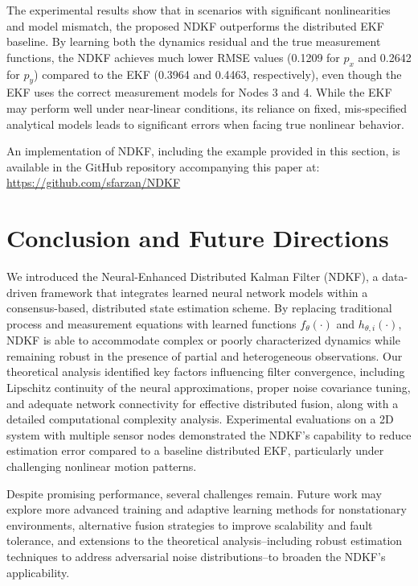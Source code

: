\documentclass[letterpaper, 10 pt, conference]{ieeeconf}
\begin{document}
The experimental results show that in scenarios with significant nonlinearities and model mismatch, the proposed NDKF outperforms the distributed EKF baseline. By learning both the dynamics residual and the true measurement functions, the NDKF achieves much lower RMSE values (0.1209 for $p_x$ and 0.2642 for $p_y$) compared to the EKF (0.3964 and 0.4463, respectively), even though the EKF uses the correct measurement models for Nodes 3 and 4. While the EKF may perform well under near‑linear conditions, its reliance on fixed, mis‑specified analytical models leads to significant errors when facing true nonlinear behavior.
 
An implementation of NDKF, including the example provided in this section, is available in the GitHub repository accompanying this paper at: \\{\small\url{https://github.com/sfarzan/NDKF}}

\section{Conclusion and Future Directions}\label{sec:conclusion}

We introduced the Neural-Enhanced Distributed Kalman Filter (NDKF), a data-driven framework that integrates learned neural network models within a consensus-based, distributed state estimation scheme. By replacing traditional process and measurement equations with learned functions $f_{\theta}(\cdot)$ and $h_{\theta,i}(\cdot)$, NDKF is able to accommodate complex or poorly characterized dynamics while remaining robust in the presence of partial and heterogeneous observations.
Our theoretical analysis identified key factors influencing filter convergence, including Lipschitz continuity of the neural approximations, proper noise covariance tuning, and adequate network connectivity for effective distributed fusion, along with a detailed computational complexity analysis. Experimental evaluations on a 2D system with multiple sensor nodes demonstrated the NDKF’s capability to reduce estimation error compared to a baseline distributed EKF, particularly under challenging nonlinear motion patterns.

Despite promising performance, several challenges remain. Future work may explore more advanced training and adaptive learning methods for nonstationary environments, alternative fusion strategies to improve scalability and fault tolerance, and extensions to the theoretical analysis--including robust estimation techniques to address adversarial noise distributions--to broaden the NDKF's applicability.



\end{document}
